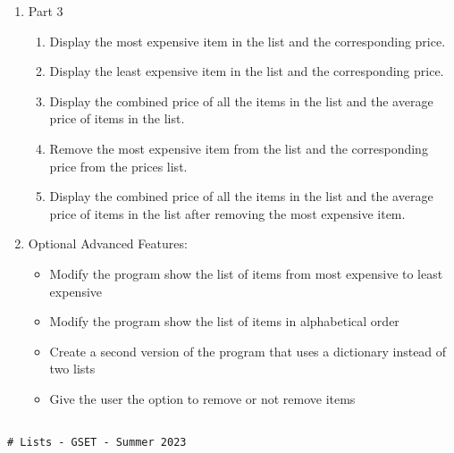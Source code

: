 \documentclass[12pt]{article}
\begin{document}
\begin{description}[labelindent=1cm]
\begin{enumerate}
	\item Part 3
	\begin{enumerate}
      \item Display the most expensive item in the list and the corresponding price.
      \item Display the least expensive item in the list and the corresponding price.
      \item Display the combined price of all the items in the list and the average price of items in the list.
      \item Remove the most expensive item from the list and the corresponding price from the prices list.
      \item Display the combined price of all the items in the list and the average price of items in the list after removing the most expensive item.
	\end{enumerate}


	\item Optional Advanced Features:
		\begin{itemize}
			 
			\item Modify the program show the list of items from most expensive to least expensive
			\item Modify the program show the list of items in alphabetical order
			\item Create a second version of the program that uses a dictionary instead of two lists
			\item Give the user the option to remove or not remove items
		    
		\end{itemize}	

	\end{enumerate}
\newpage

\item[\textbf{\underline{Example Code:}}] \hfill \vspace{0mm}

	\begin{lstlisting}

# Lists - GSET - Summer 2023 
	

	
	\end{lstlisting}
		


	\item[\textbf{\underline{Part 3 - Testing:}}] \hfill \vspace{0mm}
	\begin{enumerate}
	

\end{enumerate}
\end{description}
\end{document}
